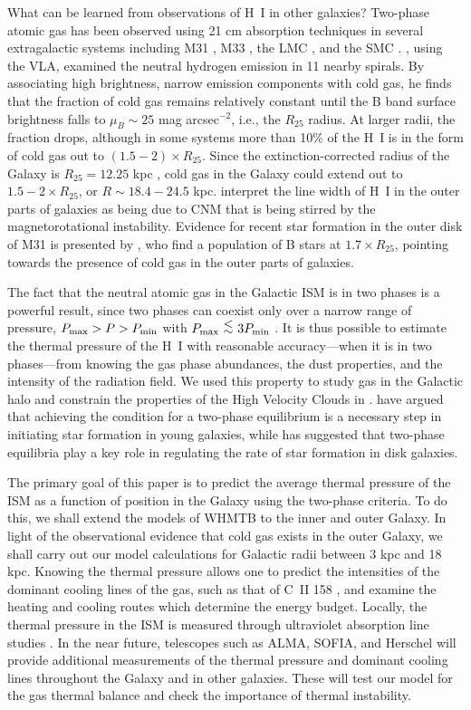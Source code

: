 \documentclass[12pt,preprint,flushrt]{aastex}
\newcommand{\pmax}{P_{\rm max}}
\newcommand{\pmin}{P_{\rm min}}
\newcommand{\al}{\mbox{ \raisebox{-.4ex}{$\stackrel{\textstyle <}{\sim}$} }}
\begin{document}
What can be learned from observations
of H~I in other galaxies?  Two-phase atomic gas has been observed
using 21 cm absorption techniques in several extragalactic systems
including M31 \citep{dic93, braun92}, M33 \citep{dic93}, the
LMC \citep{meb97}, and the SMC \citep{dic00}.  \cite{braun97}, using
the VLA,  examined the neutral hydrogen emission in 11 nearby spirals.
By associating high brightness, narrow emission components with cold gas,
he finds that the fraction of cold gas remains relatively constant
until the B band surface brightness falls to $\mu_B\sim 25$ mag
arcsec$^{-2}$, i.e., the $R_{25}$ radius.  At larger radii, the
fraction drops,
although in some systems more than
10\% of the H~I is in the form of cold gas out to
$(1.5-2) \times R_{25}$.
Since the  extinction-corrected radius of the Galaxy is
$R_{25} = 12.25$ kpc \citep{devau83},
cold gas in the Galaxy could extend out to
$1.5-2\times R_{25}$, or $R\sim 18.4-24.5$ kpc.
\cite{sel99} interpret the line width of H~I in the outer parts of
galaxies as being due to CNM that is being stirred by the
magnetorotational instability.
Evidence for recent star formation in
the outer disk of M31 is presented by \cite{cuil01},
who find a population of B stars at $1.7 \times R_{25}$, pointing
towards the presence of cold gas in the outer parts of galaxies.

The fact that the neutral atomic gas in the Galactic
ISM is in  two phases is a powerful
result, since two phases can coexist only
over a narrow range of pressure,
$\pmax > P >\pmin$ with $\pmax\al 3\pmin$
\citep[see \S~\ref{sec:Results}]{fie69}.
It is thus possible to estimate the thermal pressure
of the H~I with reasonable accuracy---when
it is in two phases---from knowing the
gas phase abundances, the dust properties, and the intensity of the
radiation field.
We used this property to study gas in the Galactic halo
and constrain the properties of the High Velocity Clouds
in \cite{wol95b}.  \cite{cor88} have argued that achieving
the condition for a two-phase equilibrium  is a necessary step in
initiating star formation in young galaxies,
while \citet{par88,par89} has suggested that
two-phase equilibria play a key role in regulating
the rate of star formation in disk galaxies.

    The primary goal of this paper is to predict the average thermal
pressure of the ISM as a function of position in the Galaxy using the
two-phase criteria. To do this,  we shall extend the models of WHMTB
to the inner and outer Galaxy.  In light of the observational 
evidence that cold gas exists in the
outer Galaxy, we shall carry out our model calculations for Galactic radii
between 3 kpc and 18 kpc. 
Knowing the thermal pressure allows
one to predict the intensities of the dominant cooling lines
of the gas, such as that of C~II 158 \micron, and examine
the heating and cooling routes which determine the energy budget.
Locally, the thermal pressure in the ISM
is measured through ultraviolet absorption line
studies \citep{jen83,jen01}.   In the near future, telescopes
such as ALMA, SOFIA, and Herschel will provide additional measurements
of the thermal pressure and dominant cooling lines
throughout the Galaxy and in other galaxies. These will test
our model for the gas thermal balance and check the importance
of thermal instability.
\end{document}
